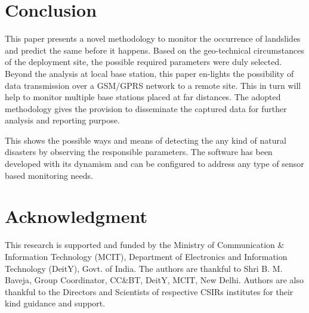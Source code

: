 \documentclass[conference]{IEEEtran}
\begin{document}
\section{Conclusion}
This paper presents a novel methodology to monitor the occurrence of landslides and predict the same before it happens.
Based on the geo-technical circumstances of the deployment site, the possible required parameters were duly selected.
Beyond the analysis at local base station, this paper en-lights the possibility of data transmission over a GSM/GPRS network to a remote site. This in turn will help to monitor multiple base stations placed at far distances. The adopted methodology gives the provision to disseminate the captured data for further analysis and reporting purpose.
\par
This shows the possible ways and means of detecting the any kind of natural disasters by observing the responsible parameters. The software has been developed with its dynamism and can be configured to address any type of sensor based monitoring needs.

\section*{Acknowledgment}
This research is supported and funded by the Ministry of Communication \& Information Technology (MCIT), Department of Electronics and Information Technology (DeitY), Govt. of India. The authors are thankful to Shri B. M. Baveja, Group Coordinator, CC\&BT, DeitY, MCIT, New Delhi. Authors are also thankful to the Directors and Scientists of respective CSIRs institutes for their kind guidance and support.
\end{document}
